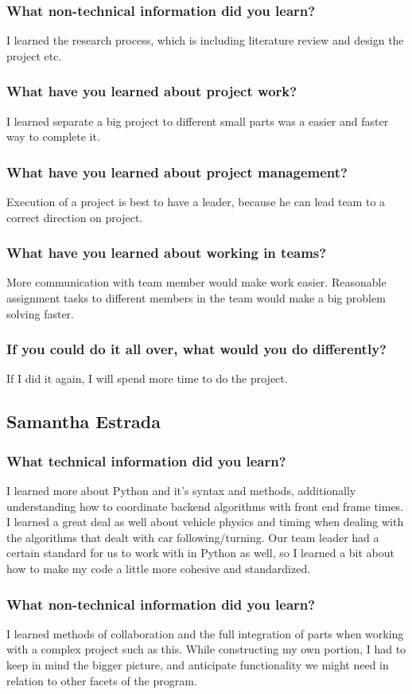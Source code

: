 \documentclass[onecolumn, draftclsnofoot,10pt, compsoc]{IEEEtran}
\begin{document}
\subsubsection{What non-technical information did you learn?}
I learned the research process, which is including literature review and design the project etc.
\subsubsection{What have you learned about project work?}
I learned separate a big project to different small parts was a easier and faster way to complete it.
\subsubsection{What have you learned about project management?}
Execution of a project is best to have a leader, because he can lead team to a correct direction on project.
\subsubsection{What have you learned about working in teams?}
More communication with team member would make work easier.
Reasonable assignment tasks to different members in the team would make a big problem solving faster.
\subsubsection{If you could do it all over, what would you do differently?}
If I did it again, I will spend more time to do the project.
\subsection{Samantha Estrada}
\subsubsection{What technical information did you learn?}
I learned more about Python and it’s syntax and methods, additionally understanding how to coordinate backend algorithms with front end frame times.
I learned a great deal as well about vehicle physics and timing when dealing with the algorithms that dealt with car following/turning.
Our team leader had a certain standard for us to work with in Python as well, so I learned a bit about how to make my code a little more cohesive and standardized.
\subsubsection{What non-technical information did you learn?}
I learned methods of collaboration and the full integration of parts when working with a complex project such as this.
While constructing my own portion, I had to keep in mind the bigger picture, and anticipate functionality we might need in relation to other facets of the program.
\end{document}
